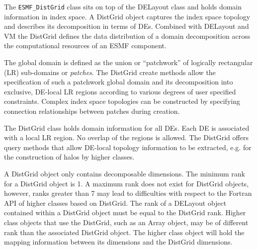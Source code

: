 
The {\tt ESMF\_DistGrid} class sits on top of the DELayout class and holds domain information in index space. A DistGrid object captures the index space topology and describes its decomposition in terms of DEs. Combined with DELayout and VM the DistGrid defines the data distribution of a domain decomposition across the computational resources of an ESMF component.

The global domain is defined as the union or ``patchwork'' of logically rectangular (LR) sub-domains or {\em patches}. The DistGrid create methods allow the specification of such a patchwork global domain and its decomposition into exclusive, DE-local LR regions according to various degrees of user specified constraints. Complex index space topologies can be constructed by specifying connection relationships between patches during creation.

The DistGrid class holds domain information for all DEs. Each DE is associated with a local LR region. No overlap of the regions is allowed. The DistGrid offers query methods that allow DE-local topology information to be extracted, e.g. for the construction of halos by higher classes.

A DistGrid object only contains decomposable dimensions. The minimum rank for a DistGrid object is 1. A maximum rank does not exist for DistGrid objects, however, ranks greater than 7 may lead to difficulties with respect to the Fortran API of higher classes based on DistGrid. The rank of a DELayout object contained within a DistGrid object must be equal to the DistGrid rank. Higher class objects that use the DistGrid, such as an Array object, may be of different rank than the associated DistGrid object. The higher class object will hold the mapping information between its dimensions and the DistGrid dimensions.
